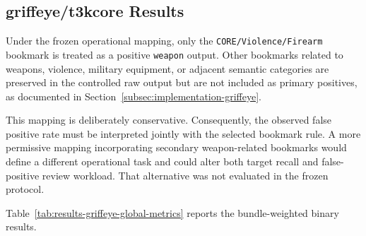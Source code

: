 \subsection{\texorpdfstring{\gls{griffeye}/\gls{t3kcore}}{Magnet Griffeye/T3K CORE} Results}
\label{subsec:results-griffeye}

Under the frozen operational mapping, only the
\texttt{CORE/Violence/Firearm} bookmark is treated as a positive
\texttt{weapon} output. Other bookmarks related to weapons, violence,
military equipment, or adjacent semantic categories are preserved in the
controlled raw output but are not included as primary positives, as documented
in Section~\ref{subsec:implementation-griffeye}.

This mapping is deliberately conservative. Consequently, the observed false
positive rate must be interpreted jointly with the selected bookmark rule. A
more permissive mapping incorporating secondary weapon-related bookmarks would
define a different operational task and could alter both target recall and
false-positive review workload. That alternative was not evaluated in the
frozen protocol.

Table~\ref{tab:results-griffeye-global-metrics} reports the bundle-weighted
binary results.

